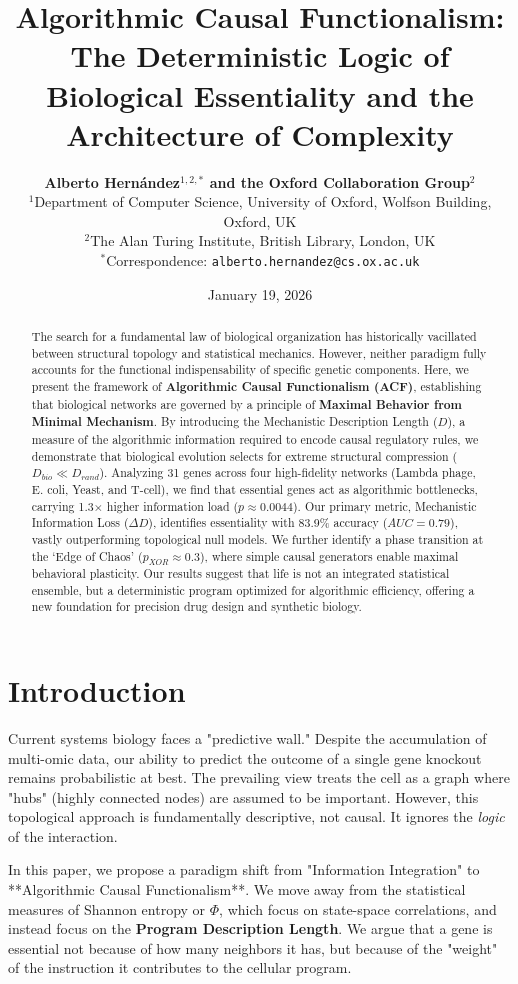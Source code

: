 \documentclass[10pt,twocolumn]{article}
\title{\textbf{Algorithmic Causal Functionalism: The Deterministic Logic of Biological Essentiality and the Architecture of Complexity}}
\author{
    \textbf{Alberto Hernández$^{1,2,*}$ and the Oxford Collaboration Group$^2$}\\
    \small $^1$Department of Computer Science, University of Oxford, Wolfson Building, Oxford, UK\\
    \small $^2$The Alan Turing Institute, British Library, London, UK\\
    \small $^*$Correspondence: \texttt{alberto.hernandez@cs.ox.ac.uk}
}
\date{January 19, 2026}
\begin{document}
\maketitle

\begin{abstract}
The search for a fundamental law of biological organization has historically vacillated between structural topology and statistical mechanics. However, neither paradigm fully accounts for the functional indispensability of specific genetic components. Here, we present the framework of \textbf{Algorithmic Causal Functionalism (ACF)}, establishing that biological networks are governed by a principle of \textbf{Maximal Behavior from Minimal Mechanism}. By introducing the Mechanistic Description Length ($D$), a measure of the algorithmic information required to encode causal regulatory rules, we demonstrate that biological evolution selects for extreme structural compression ($D_{bio} \ll D_{rand}$). Analyzing 31 genes across four high-fidelity networks (Lambda phage, E. coli, Yeast, and T-cell), we find that essential genes act as algorithmic bottlenecks, carrying 1.3$\times$ higher information load ($p \approx 0.0044$). Our primary metric, Mechanistic Information Loss ($\Delta D$), identifies essentiality with 83.9\% accuracy ($AUC=0.79$), vastly outperforming topological null models. We further identify a phase transition at the `Edge of Chaos' ($p_{XOR} \approx 0.3$), where simple causal generators enable maximal behavioral plasticity. Our results suggest that life is not an integrated statistical ensemble, but a deterministic program optimized for algorithmic efficiency, offering a new foundation for precision drug design and synthetic biology.
\end{abstract}

\section{Introduction}
Current systems biology faces a "predictive wall." Despite the accumulation of multi-omic data, our ability to predict the outcome of a single gene knockout remains probabilistic at best. The prevailing view treats the cell as a graph where "hubs" (highly connected nodes) are assumed to be important. However, this topological approach is fundamentally descriptive, not causal. It ignores the \textit{logic} of the interaction.

In this paper, we propose a paradigm shift from "Information Integration" to **Algorithmic Causal Functionalism**. We move away from the statistical measures of Shannon entropy or $\Phi$, which focus on state-space correlations, and instead focus on the \textbf{Program Description Length}. We argue that a gene is essential not because of how many neighbors it has, but because of the "weight" of the instruction it contributes to the cellular program.
\end{document}
